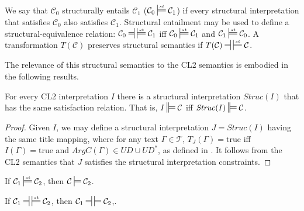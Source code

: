 \documentclass{IOS-Book-Article}
\newcommand{\corp}{ \mathcal{C} }
\newcommand{\texts}{ \mathcal{T} }
\newcommand{\Struc}{\mathit{Struc}}
\newcommand{\true}{\mathrm{true}}
\newcommand{\mdpf}{\ensuremath{\sdtstile[ss]{}{}}}
\newcommand{\smdpf}{\ensuremath{\ddtstile[ss]{}{}}}
\newcommand{\Sat}[2]{{#1}\smdpf{#2}}
\newcommand{\mdpfEquiv}{\ensuremath{\ndststile[ss]{\hspace*{3 pt }}{}\hspace*{3 pt}\sdtstile[ss]{}{}}}
\newcommand{\mdpfstruct}{\ensuremath{\sdtstile[ss]{}{st}}}
\newcommand{\mdpfstructEquiv}{\ensuremath{\ndststile[ss]{\hspace*{3 pt }}{}\hspace*{3 pt}\sdtstile[ss]{}{st}}}
\begin{document}
We say that $\corp_0$ structurally entails $\corp_1$ ($\corp_0\mdpfstruct\corp_1$) if every structural interpretation that satisfies $\corp_0$ also satisfies $\corp_1$. Structural entailment may be used to define a structural-equivalence relation:
$\corp_0\mdpfstructEquiv\corp_1$ iff $\corp_0\mdpfstruct\corp_1$ and $\corp_1\mdpfstruct\corp_0$.
A transformation $T(\corp)$ preserves structural semantics if $T(\corp)\mdpfstructEquiv\corp$.

The relevance of this structural semantics to the CL2 semantics is embodied in the following results.
\begin{theo}
\label{preinterp}
For every CL2 interpretation $I$ there is a structural interpretation $\Struc(I)$ that has the same satisfaction relation. That is, $\Sat{I}{\corp}$ iff $\Sat{\Struc(I)}{\corp}$.
\begin{proof} Given $I$, we may define a structural interpretation $J = \Struc(I)$ having the same title mapping, where for any text $\Gamma\in\texts$, $T_J(\Gamma)=\true$ iff $I(\Gamma)=\true$ and $ArgC(\Gamma)\in UD \cup UD^*$, as defined in \cite{CDv2}. 
It follows from the CL2 semantics that $J$ satisfies the structural interpretation constraints. 
\end{proof}
\end{theo}

\begin{cor}
\label{preentail}
If $\corp_1\mdpfstruct\corp_2$, then $\corp\mdpf\corp_2$.
\end{cor}

\begin{cor}
\label{preequiv}
If $\corp_1\mdpfstructEquiv\corp_2$, then $\corp_1\mdpfEquiv\corp_2$,.
\end{cor}
\end{document}
